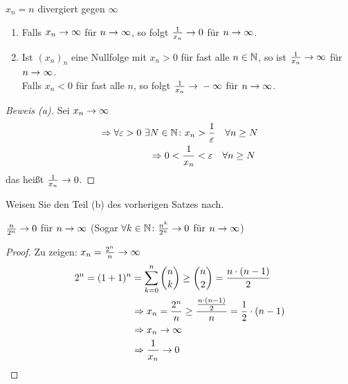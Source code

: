 \begin{beispiel}
    $x_n=n$ divergiert gegen $\infty$
\end{beispiel}


\begin{satz}
    \theoremescape
    \begin{enumerate}[label=(\alph*)]
        \item Falls $x_n\rightarrow{} \infty$ für $n\rightarrow{}\infty$, so folgt $\frac{1}{x_n}\rightarrow{} 0$ für $n\rightarrow{}\infty$.
        \item Ist $(x_n)_n$ eine Nullfolge mit $x_n > 0$ für fast alle $n\in\mathbb{N}$, so ist $\frac{1}{x_n}\rightarrow{} \infty$ für $n\rightarrow{}\infty$.\\
        Falls $x_n < 0$ für fast alle $n$, so folgt $\frac{1}{x_n} \rightarrow{} -\infty$ für $n\rightarrow{}\infty$.
    \end{enumerate}

    \begin{proof}[Beweis (a)]
        Sei $x_n\rightarrow{} \infty$
        \begin{align*}
            \Rightarrow{} \forall \varepsilon > 0~\exists N\in\mathbb{N}\colon x_n &> \frac{1}{\varepsilon}\quad\forall n \geq N\\
            \Rightarrow{} 0 < \frac{1}{x_n} &< \varepsilon\quad \forall n \geq N
        \end{align*}
        das heißt $\frac{1}{x_n}\rightarrow{} 0$.
    \end{proof}
\end{satz}

\begin{uebung}
    Weisen Sie den Teil (b) des vorherigen Satzes nach.
\end{uebung}

\begin{beispiel}
    $\frac{n}{2^n}\rightarrow{} 0$ für $n\rightarrow{}\infty$ (Sogar $\forall k\in\mathbb{N}\colon \frac{n^k}{2^n} \rightarrow{} 0$ für $n\rightarrow{}\infty$)

    \begin{proof}
        Zu zeigen: $x_n = \frac{2^n}{n}\rightarrow{} \infty$
        \begin{align*}
            2^n = (1+1)^n &= \sum_{k=0}^{n} \binom{n}{k}\geq \binom{n}{2} = \frac{n\cdot (n-1)}{2}\\
            &\Rightarrow{} x_n = \frac{2^n}{n}\geq \frac{\frac{n\cdot (n-1)}{2}}{n} = \frac{1}{2}\cdot (n-1)\\
            &\Rightarrow{} x_n \rightarrow{} \infty\\
            &\Rightarrow{} \frac{1}{x_n}\rightarrow{} 0\qedhere
        \end{align*}
    \end{proof}
\end{beispiel}

